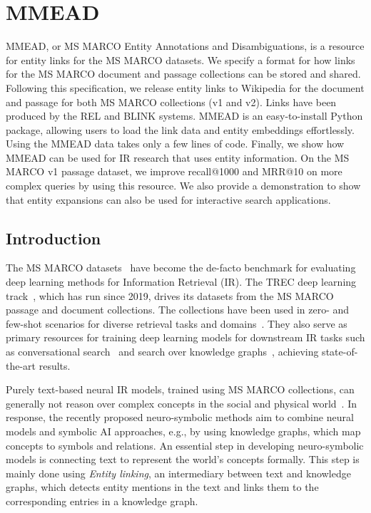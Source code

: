 \chapter{MMEAD}
\label{mmead}

\begin{Abstract}
	\begin{changemargin}{1cm}{1cm}
		MMEAD, or MS MARCO Entity Annotations and Disambiguations, is a resource for entity links for the MS MARCO datasets. We specify a format for how links for the MS MARCO document and passage collections can be stored and shared. Following this specification, we release entity links to Wikipedia for the document and passage for both MS MARCO collections (v1 and v2). Links have been produced by the REL and BLINK systems. 
		MMEAD is an easy-to-install Python package, allowing users to load the link data and entity embeddings effortlessly. Using the MMEAD data takes only a few lines of code. Finally, we show how MMEAD can be used for IR research that uses entity information. On the MS MARCO v1 passage dataset, we improve recall@1000 and MRR@10 on more complex queries by using this resource. We also provide a demonstration to show that entity expansions can also be used for interactive search applications.   
	\end{changemargin}
\end{Abstract}

\section{Introduction}
The MS MARCO datasets~\citep{msmarco} have become the de-facto benchmark for evaluating deep learning methods for Information Retrieval (IR). The TREC deep learning track~\citep{trec-dl}, which has run since 2019, drives its datasets from the MS MARCO passage and document collections. The collections have been used in zero- and few-shot scenarios for diverse retrieval tasks and domains~\citep{thakur2021beir, thakur2022domain, xu2022laprador}. They also serve as primary resources for training deep learning models for downstream IR tasks such as conversational search~\citep{dalton2021cast} and search over knowledge graphs~\citep{Gerritse:2022:EMBERT}, achieving state-of-the-art results.

Purely text-based neural IR models, trained using MS MARCO collections, can generally not reason over complex concepts in the social and physical world~\citep{bosselut2021dynamic, sciavolino:2021:simple}. In response, the recently proposed neuro-symbolic methods aim to combine neural models and symbolic AI approaches, e.g., by using knowledge graphs, which map concepts to symbols and relations. An essential step in developing neuro-symbolic models is connecting text to represent the world's concepts formally. This step is mainly done using \textit{Entity linking}, an intermediary between text and knowledge graphs, which detects entity mentions in the text and links them to the corresponding entries in a knowledge graph.

